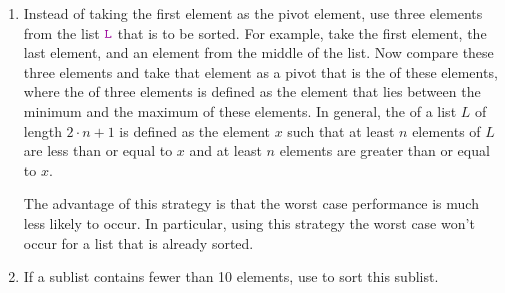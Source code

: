 \begin{enumerate}
\item Instead of taking the first element as the pivot element, use three elements from the list
      $\mytt{L}$ that is to be sorted.  For example, take the first element, the last element, and an
      element from the middle of the list.  Now compare these three elements and take that element as
      a pivot that is the  of these elements,  where the   of three
      elements is defined as the element that lies between the minimum and the maximum of these elements.
      In general, the  of a list $L$ of length $2 \cdot n +1$ is defined as the element $x$ such that at
      least $n$ elements of $L$ are less than or equal to $x$ and at least $n$ elements are greater than or equal to $x$.
      
      The advantage of this strategy is that the worst case performance is much less likely to occur.  In
      particular,  using this strategy the worst case won't occur for a list that is already
      sorted.
\item If a sublist contains fewer than 10 elements, use  to sort this sublist.


\end{enumerate}
